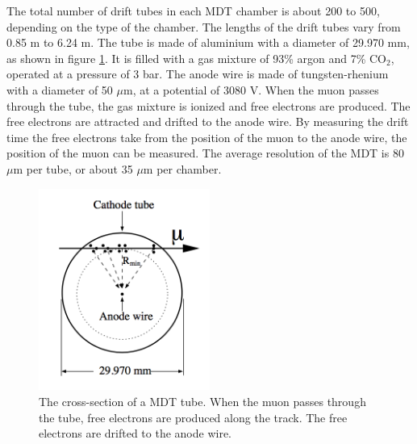 The total number of drift tubes in each MDT chamber is about 200 to 500, depending on the type of the chamber.
The lengths of the drift tubes vary from 0.85 m to 6.24 m.
The tube is made of aluminium with a diameter of 29.970 mm, as shown in figure \ref{fig:MDT}.
It is filled with a gas mixture of 93\% argon and 7\% CO$_2$, operated at a pressure of 3 bar.
The anode wire is made of tungsten-rhenium with a diameter of 50 $\mu$m, at a potential of 3080 V.
When the muon passes through the tube, the gas mixture is ionized and free electrons are produced.
The free electrons are attracted and drifted to the anode wire.
By measuring the drift time the free electrons take from the position of the muon to the anode wire, the position of the muon can be measured.
The average resolution of the MDT is 80 $\mu$m per tube, or about 35 $\mu$m per chamber.

\begin{figure}
\centering
\includegraphics[width=0.5\textwidth]{data/photo/detector/MDT.png}
\caption{The cross-section of a MDT tube. When the muon passes through the tube, free electrons are produced along the track. The free electrons are drifted to the anode wire. \cite{ATLAS_doc}}
\label{fig:MDT}
\end{figure}

